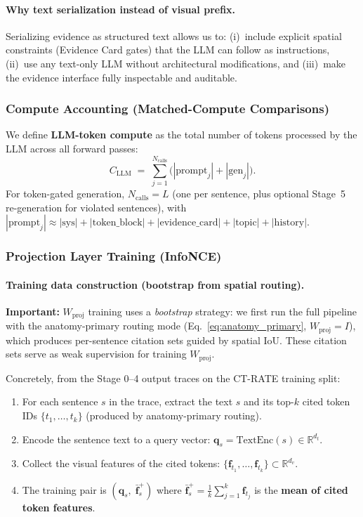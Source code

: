 \documentclass[11pt,a4paper]{article}
\newcommand{\RR}{\mathbb{R}}
\begin{document}
\paragraph{Why text serialization instead of visual prefix.}
Serializing evidence as structured text allows us to: (i)~include explicit spatial constraints (Evidence Card gates) that the LLM can follow as instructions, (ii)~use any text-only LLM without architectural modifications, and (iii)~make the evidence interface fully inspectable and auditable.


\subsubsection{Compute Accounting (Matched-Compute Comparisons)}
\label{sec:compute_accounting}

We define \textbf{LLM-token compute} as the total number of tokens processed by the LLM across all forward passes:
\[
C_{\mathrm{LLM}} \;=\; \sum_{j=1}^{N_{\mathrm{calls}}} \bigl(|\mathrm{prompt}_j| + |\mathrm{gen}_j|\bigr).
\]
For token-gated generation, $N_{\mathrm{calls}}{=}L$ (one per sentence, plus optional Stage~5 re-generation for violated sentences), with $|\mathrm{prompt}_j| \approx |\mathrm{sys}| + |\mathrm{token\_block}| + |\mathrm{evidence\_card}| + |\mathrm{topic}| + |\mathrm{history}|$.


\subsubsection{Projection Layer Training (InfoNCE)}
\label{sec:projection_training}

\paragraph{Training data construction (bootstrap from spatial routing).}
\textbf{Important:} $W_{\mathrm{proj}}$ training uses a \emph{bootstrap} strategy: we first run the full pipeline with the anatomy-primary routing mode (Eq.~\ref{eq:anatomy_primary}, $W_{\mathrm{proj}} = I$), which produces per-sentence citation sets guided by spatial IoU.
These citation sets serve as weak supervision for training $W_{\mathrm{proj}}$.

Concretely, from the Stage 0--4 output traces on the CT-RATE training split:
\begin{enumerate}[nosep]
    \item For each sentence $s$ in the trace, extract the text $s$ and its top-$k$ cited token IDs $\{t_1, \ldots, t_k\}$ (produced by anatomy-primary routing).
    \item Encode the sentence text to a query vector: $\mathbf{q}_s = \mathrm{TextEnc}(s) \in \RR^{d_t}$.
    \item Collect the visual features of the cited tokens: $\{\mathbf{f}_{t_1}, \ldots, \mathbf{f}_{t_k}\} \subset \RR^{d_v}$.
    \item The training pair is $(\mathbf{q}_s, \; \bar{\mathbf{f}}_s^{+})$ where $\bar{\mathbf{f}}_s^{+} = \frac{1}{k}\sum_{j=1}^k \mathbf{f}_{t_j}$ is the \textbf{mean of cited token features}.
\end{enumerate}
\end{document}
